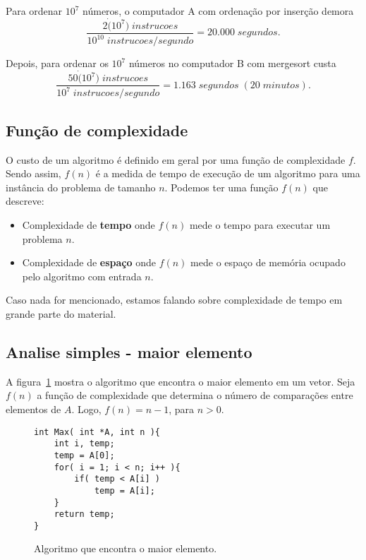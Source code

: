 Para ordenar $10^7$ números, o computador A com ordenação por inserção demora
\begin{equation*}
\frac{2\dot (10^7)\; instrucoes}{10^{10}\; instrucoes/segundo} = 20.000 \; segundos.
\end{equation*}

Depois, para ordenar os $10^7$ números no computador B com mergesort custa
\begin{equation*}
\frac{50 \dot (10^7)\; instrucoes}{10^{7}\; instrucoes/segundo} = 1.163 \; segundos \;(20\; minutos).
\end{equation*}

\subsection{Função de complexidade}

O custo de um algoritmo é definido em geral por uma função de complexidade $f$. Sendo assim,
$f(n)$ é a medida de tempo de execução de um algoritmo para uma instância do problema de tamanho $n$.
Podemos ter uma função $f(n)$ que descreve:
\begin{itemize}
\item Complexidade de {\bf tempo} onde $f(n)$ mede o tempo para executar um problema $n$.
\item Complexidade de {\bf espaço} onde $f(n)$ mede o espaço de memória ocupado pelo algoritmo
com entrada $n$.
\end{itemize}

Caso nada for mencionado, estamos falando sobre complexidade de tempo em grande parte do material.

\subsection{Analise simples - maior elemento}

A figura~\ref{aula02:algo:max} mostra o algoritmo que encontra o maior elemento em um vetor.
Seja $f(n)$ a função de complexidade que determina o número de comparações entre elementos de $A$.
Logo, $f(n) = n - 1$, para $n > 0$.
%
\begin{figure}[!htb]
\centering
\begin{framed}
\begin{lstlisting}
int Max( int *A, int n ){
	int i, temp;
	temp = A[0];
	for( i = 1; i < n; i++ ){
		if( temp < A[i] )
			temp = A[i];
	}
	return temp;
}
\end{lstlisting}
\end{framed}
\caption{Algoritmo que encontra o maior elemento.}
\label{aula02:algo:max}
\end{figure}

